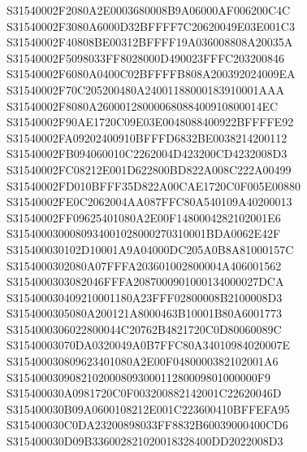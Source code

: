 \documentclass[12pt,a4paper]{article}
\begin{document}
\begin{framed}
{S31540002F2080A2E0003680008B9A06000AF006200C4C\newline
S31540002F3080A6000D32BFFFF7C20620049E03E001C3\newline
S31540002F40808BE00312BFFFF19A036008808A20035A\newline
S31540002F5098033FF8028000D490023FFFC203200846\newline
S31540002F6080A0400C02BFFFFB808A200392024009EA\newline
S31540002F70C205200480A24001188000183910001AAA\newline
S31540002F8080A26000128000068088400910800014EC\newline
S31540002F90AE1720C09E03E0048088400922BFFFFE92\newline
S31540002FA09202400910BFFFD6832BE0038214200112\newline
S31540002FB094060010C2262004D423200CD4232008D3\newline
S31540002FC08212E001D622800BD822A008C222A00499\newline
S31540002FD010BFFF35D822A00CAE1720C0F005E00880\newline
S31540002FE0C2062004AA087FFC80A540109A40200013\newline
S31540002FF09625401080A2E00F1480004282102001E6\newline
S3154000300080934001028000270310001BDA0062E42F\newline
S315400030102D10001A9A04000DC205A0B8A81000157C\newline
S3154000302080A07FFFA203601002800004A406001562\newline
S3154000303082046FFFA2087000901000134000027DCA\newline
S315400030409210001180A23FFF02800008B2100008D3\newline
S3154000305080A200121A8000463B10001B80A6001773\newline
S3154000306022800044C20762B4821720C0D80060089C\newline
S31540003070DA0320049A0B7FFC80A34010984020007E\newline
S315400030809623401080A2E00F0480000382102001A6\newline
S3154000309082102000809300011280009801000000F9\newline
S315400030A0981720C0F003200882142001C22620046D\newline
S315400030B09A0600108212E001C223600410BFFEFA95\newline
S315400030C0DA23200898033FF8832B60039000400CD6\newline
S315400030D09B336002821020018328400DD2022008D3\newline
}
\end{framed}
\end{document}
